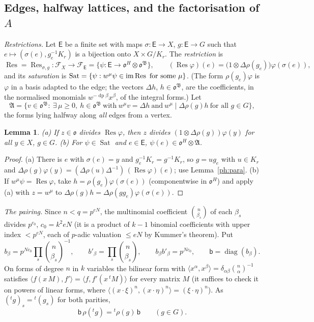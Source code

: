 \documentclass[10pt]{amsart}
\newtheorem{lemma}[theorem]{Lemma}
\theoremstyle{definition}
\theoremstyle{remark}
\providecommand{\pao}{\mathfrak o}
\providecommand{\phA}{\mathfrak A}
\providecommand{\phB}{\mathfrak B}
\providecommand{\phdep}{\operatorname{dp}}
\begin{document}
\subsection{Edges, halfway lattices, and the factorisation of $A$}\label{ph:ss-edges}
\emph{Restrictions.} Let $\mathsf E$ be a finite set with maps $\sigma\colon\mathsf E\to X$,
$g\colon\mathsf E\to G$ such that $e\mapsto(\sigma(e),g_e^{-1}K_r)$ is a bijection onto
$X\times G/K_r$. The \emph{restriction} is
\[
\operatorname{Res}=\operatorname{Res}_{\sigma,g}\colon\mathcal F_X\to\mathcal F_{\mathsf E}
=\{\psi\colon\mathsf E\to\pao^H\otimes\pao^\phB\},\qquad(\operatorname{Res}\varphi)(e)=
\bigl(1\otimes\Delta\rho(g_e)\bigr)\varphi(\sigma(e)),
\]
and its \emph{saturation} is $\operatorname{Sat}=\{\psi:w^\mu\psi\in\operatorname{im}\operatorname{Res}\text{
for some }\mu\}$. (The form $\rho(g_e)\varphi$ is $\varphi$ in a basis adapted to the edge; the
vectors $\Delta h$, $h\in\pao^\phB$, are the coefficients, in the normalised monomials
$w^{-\phdep\beta}x^\beta$, of the integral forms.) Let
\[
\phA=\bigl\{v\in\pao^\phB:\ \exists\,\mu\ge0,\ h\in\pao^\phB\ \text{with}\ w^\mu v=\Delta h\
\text{and}\ w^\mu\mid\Delta\rho(g)h\ \text{for all }g\in G\bigr\},
\]
the forms lying halfway along \emph{all} edges from a vertex.

\begin{lemma}\label{ph:sat}
{\rm(a)} If $z\in\pao$ divides $\operatorname{Res}\varphi$, then $z$ divides $(1\otimes\Delta
\rho(g))\varphi(y)$ for all $y\in X$, $g\in G$. {\rm(b)} For $\psi\in\operatorname{Sat}$ and
$e\in\mathsf E$, $\psi(e)\in\pao^H\otimes\phA$.
\end{lemma}
\begin{proof}
(a) There is $e$ with $\sigma(e)=y$ and $g_e^{-1}K_r=g^{-1}K_r$, so $g=ug_e$ with $u\in K_r$ and
$\Delta\rho(g)\varphi(y)=(\Delta\rho(u)\Delta^{-1})\,(\operatorname{Res}\varphi)(e)$; use
Lemma~\ref{ph:para}. (b) If $w^\mu\psi=\operatorname{Res}\varphi$, take
$h=\rho(g_e)\varphi(\sigma(e))$ (componentwise in $\pao^H$) and apply (a) with $z=w^\mu$ to
$\Delta\rho(g)h=\Delta\rho(gg_e)\varphi(\sigma(e))$.
\end{proof}

\emph{The pairing.} Since $n<q=p^{eN}$, the multinomial coefficient $\binom n{\beta_s}$ of each
$\beta_s$ divides $p^{c_0}$, $c_0=k^2eN$ (it is a product of $k-1$ binomial coefficients with upper
index $<p^{eN}$, each of $p$-adic valuation $\le eN$ by Kummer's theorem). Put
\[
b_\beta=p^{Nc_0}\prod_s\binom n{\beta_s}^{-1},\qquad b'_\beta=\prod_s\binom n{\beta_s},\qquad
b_\beta b'_\beta=p^{Nc_0},\qquad\mathsf b=\operatorname{diag}(b_\beta).
\]
On forms of degree $n$ in $k$ variables the bilinear form with $\langle x^\alpha,x^\beta\rangle=
\delta_{\alpha\beta}\binom n\alpha^{-1}$ satisfies $\langle f(x\,M),f'\rangle=\langle f,f'(x\,{}^tM)
\rangle$ for every matrix $M$ (it suffices to check it on powers of linear forms, where
$\langle(x\cdot\xi)^n,(x\cdot\eta)^n\rangle=(\xi\cdot\eta)^n$). As $({}^tg)_s={}^t(g_s)$ for both
parities,
\begin{equation}\label{ph:eq-adj}
\mathsf b\,\rho({}^tg)={}^t\rho(g)\,\mathsf b\qquad(g\in G).
\end{equation}
\end{document}
